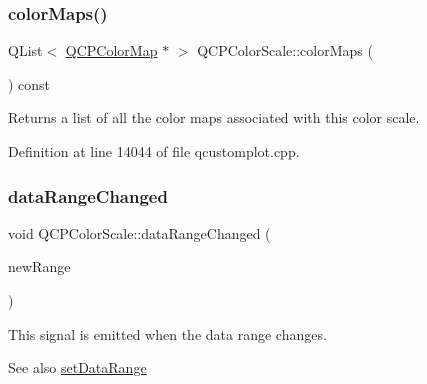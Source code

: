 \mbox{\label{class_q_c_p_color_scale_a556adc6b0216ebc1cc4317c541956d06}} 
\subsubsection{\texorpdfstring{color\+Maps()}{colorMaps()}}
{\footnotesize\ttfamily Q\+List$<$ \hyperlink{class_q_c_p_color_map}{Q\+C\+P\+Color\+Map} $\ast$ $>$ Q\+C\+P\+Color\+Scale\+::color\+Maps (\begin{DoxyParamCaption}{ }\end{DoxyParamCaption}) const}

Returns a list of all the color maps associated with this color scale. 

Definition at line 14044 of file qcustomplot.\+cpp.

\mbox{\label{class_q_c_p_color_scale_a293176da9447ec6819be1d901966a257}} 
\subsubsection{\texorpdfstring{data\+Range\+Changed}{dataRangeChanged}}
{\footnotesize\ttfamily void Q\+C\+P\+Color\+Scale\+::data\+Range\+Changed (\begin{DoxyParamCaption}\item[{\hyperlink{class_q_c_p_range}{Q\+C\+P\+Range}}]{new\+Range }\end{DoxyParamCaption})\hspace{0.3cm}{\ttfamily [signal]}}

This signal is emitted when the data range changes.

\begin{DoxySeeAlso}{See also}
\hyperlink{class_q_c_p_color_scale_abe88633003a26d1e756aa74984587fef}{set\+Data\+Range} 
\end{DoxySeeAlso}
\mbox{\label{class_q_c_p_color_scale_a61558b962f7791ff2f15a565dcf60181}} 
